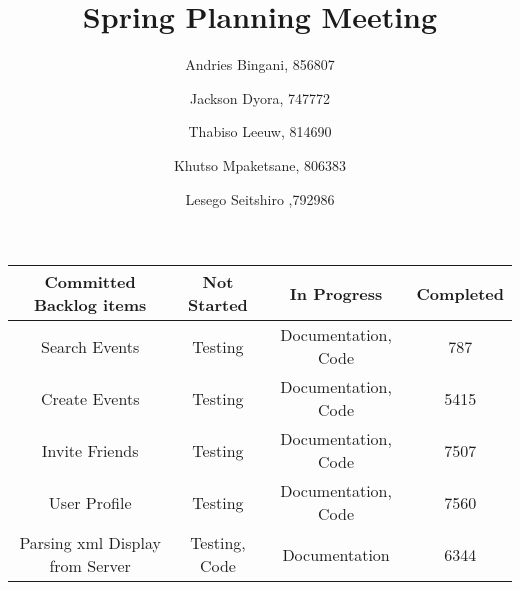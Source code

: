 \documentclass[10pt,a4paper]{article}
\author{
  Andries Bingani, 856807 \and
  Jackson Dyora, 747772\and
  Thabiso Leeuw, 814690 \and
  Khutso Mpaketsane, 806383 \and
  Lesego Seitshiro ,792986
}
\title{Spring Planning Meeting}
\begin{document}
\maketitle


\begin{center}
 \begin{tabular}{||c | c | c | c||} 
 \hline
Committed Backlog items & Not Started & In Progress & Completed \\ [0.5ex] 
 \hline\hline
 Search Events & Testing & Documentation,  Code & 787 \\ 
 \hline
 Create Events &  Testing &  Documentation, Code & 5415 \\
 \hline
 Invite Friends &  Testing &  Documentation, Code & 7507 \\
 \hline
 User Profile &  Testing &  Documentation, Code & 7560 \\
 \hline
Parsing xml Display from Server &  Testing, Code &  Documentation & 6344 \\ [1ex] 
 \hline
\end{tabular}
\end{center}
\end{document}
